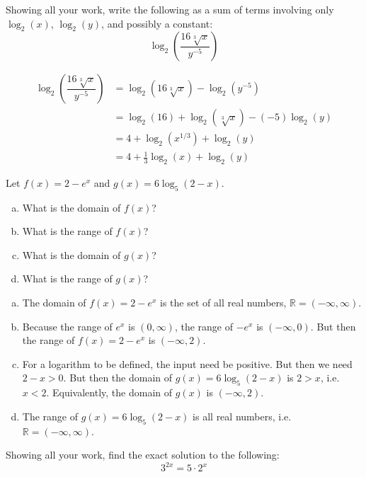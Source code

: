 \documentclass[12pt,letterpaper]{exam}
\begin{document}
\begin{questions}
\newpage
\question[10] Showing all your work, write the following as a sum of terms involving only $\log_2(x)$, $\log_2(y)$, and possibly a constant:
	\[
	\log_2 \left( \dfrac{16 \sqrt[3]{x}}{y^{-5}} \right)
	\] \pspace

{\itshape
\sol 
	\[
	\begin{aligned}
	\log_2 \left( \dfrac{16 \sqrt[3]{x}}{y^{-5}} \right)&= \log_2 \left( 16 \sqrt[3]{x} \right) - \log_2(y^{-5}) \\[0.3cm]
	&= \log_2(16) + \log_2(\sqrt[3]{x}) - (-5) \log_2(y) \\[0.3cm]
	&= 4 + \log_2(x^{1/3}) + \log_2(y) \\[0.3cm]
	&= 4 + \frac{1}{3} \log_2(x) + \log_2(y)
	\end{aligned}
	\]
}



\newpage
\question[10] Let $f(x)= 2 - e^x$ and $g(x)= 6 \log_5( 2 - x)$.
	\begin{enumerate}[(a)]
	\item What is the domain of $f(x)$?
	\item What is the range of $f(x)$?
	\item What is the domain of $g(x)$?
	\item What is the range of $g(x)$?
	\end{enumerate} \pspace

{\itshape
\sol 
\begin{enumerate}[(a)]
\item The domain of $f(x)= 2 - e^x$ is the set of all real numbers, $\mathbb{R}= (-\infty, \infty)$. \pspace

\item Because the range of $e^x$ is $(0, \infty)$, the range of $-e^x$ is $(-\infty, 0)$. But then the range of $f(x)= 2 - e^x$ is $(-\infty, 2)$. \pspace

\item For a logarithm to be defined, the input need be positive. But then we need $2 - x > 0$. But then the domain of $g(x)= 6 \log_5(2 - x)$ is $2 > x$, i.e. $x < 2$. Equivalently, the domain of $g(x)$ is $(-\infty, 2)$. \pspace

\item The range of $g(x)= 6 \log_5(2 - x)$ is all real numbers, i.e. $\mathbb{R}= (-\infty, \infty)$. 
\end{enumerate}
}



\newpage
\question[10] Showing all your work, find the exact solution to the following:
	\[
	3^{2x}= 5 \cdot 2^x
	\] 


\end{questions}
\end{document}
